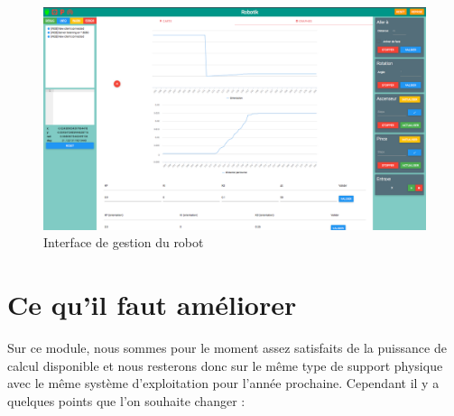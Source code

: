 	
	\begin{figure}
		\centering
		\includegraphics[width=140mm]{assets/debug.png}%
		\caption{Interface de gestion du robot}%
	\end{figure}


	\newpage

	\section{Ce qu'il faut améliorer}
	Sur ce module, nous sommes pour le moment assez satisfaits de la puissance de calcul disponible et nous resterons donc sur le même type de support physique avec le même système d'exploitation pour l'année prochaine. Cependant il y a quelques points que l'on souhaite changer :

